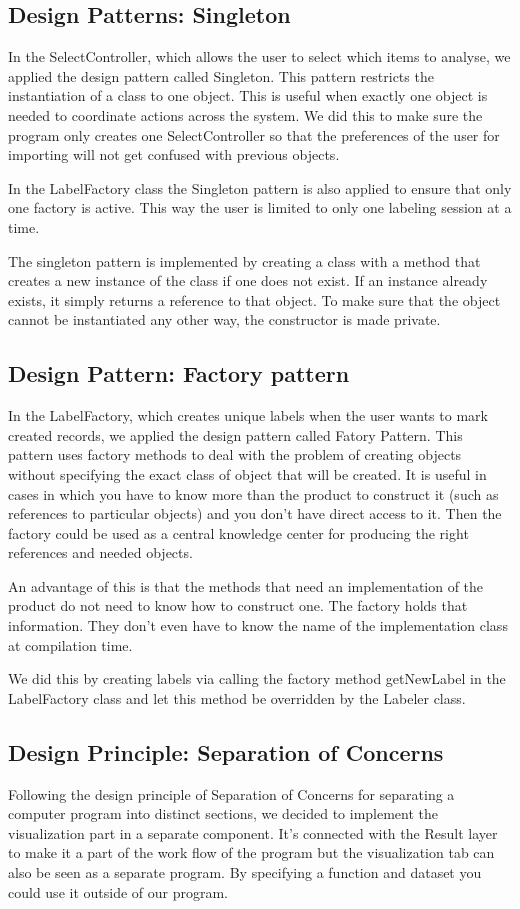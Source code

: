\documentclass[a4paper,english,fleqn]{exam}
\begin{document}
\subsection{Design Patterns: Singleton}
In the SelectController, which allows the user to select which items to analyse, we applied the design pattern called Singleton. This pattern restricts the instantiation of a class to one object. This is useful when exactly one object is needed to coordinate actions across the system. We did this to make sure the program only creates one SelectController so that the preferences of the user for importing will not get confused with previous objects. 

In the LabelFactory class the Singleton pattern is also applied to ensure that only one factory is active. This way the user is limited to only one labeling session at a time.

The singleton pattern is implemented by creating a class with a method that creates a new instance of the class if one does not exist. If an instance already exists, it simply returns a reference to that object. To make sure that the object cannot be instantiated any other way, the constructor is made private. 

\subsection{Design Pattern: Factory pattern}
In the LabelFactory, which creates unique labels when the user wants to mark created records, we applied the design pattern called Fatory Pattern. This pattern uses factory methods to deal with the problem of creating objects without specifying the exact class of object that will be created. It is useful in cases in which you have to know more than the product to construct it (such as references to particular objects) and you don't have direct access to it. Then the factory could be used as a central knowledge center for producing the right references and needed objects.

An advantage of this is that the methods that need an implementation of the product do not need to know how to construct one. The factory holds that information. They don't even have to know the name of the implementation class at compilation time.

We did this by creating labels via calling the factory method getNewLabel in the LabelFactory class and let this method be overridden by the Labeler class. 

\subsection{Design Principle: Separation of Concerns}
Following the design principle of Separation of Concerns for separating a computer program into distinct sections, we decided to implement the visualization part in a separate component. It's connected with the Result layer to make it a part of the work flow of the program but the visualization tab can also be seen as a separate program. By specifying a function and dataset you could use it outside of our program. 
\end{document}
